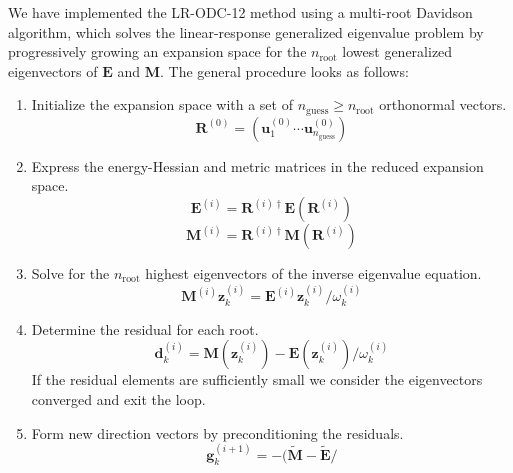     We have implemented the LR-ODC-12 method using a multi-root Davidson algorithm,
    which solves the linear-response generalized eigenvalue problem by progressively
    growing an expansion space for the \(n_\mathrm{root}\) lowest generalized
    eigenvectors of \(\mathbf{E}\) and \(\mathbf{M}\).
    The general procedure looks as follows:
    \begin{enumerate}
        \item
            \label{item:davidson-initialization}
            Initialize the expansion space with a set of \(n_\mathrm{guess}\geq
            n_\mathrm{root}\) orthonormal vectors.
            \[
                \mathbf{R}^{(0)}
                =
                (
                    \mathbf{u}_1^{(0)}
                    \cdots
                    \mathbf{u}_{n_\mathrm{guess}}^{(0)}
                )
            \]
        \item
            \label{item:davidson-step-one}
            Express the energy-Hessian and metric matrices in the reduced expansion
            space.
            \[
                \mathbf{E}^{(i)}
                =
                \mathbf{R}^{(i)\dagger}
                \mathbf{E}(\mathbf{R}^{(i)})
            \]
            \[
                \mathbf{M}^{(i)}
                =
                \mathbf{R}^{(i)\dagger}
                \mathbf{M}(\mathbf{R}^{(i)})
            \]
        \item
            Solve for the \(n_\mathrm{root}\) highest eigenvectors of the
            inverse eigenvalue equation.
            \[
                \mathbf{M}^{(i)}
                \mathbf{z}_k^{(i)}
                =
                \mathbf{E}^{(i)}
                \mathbf{z}_k^{(i)}/
                \omega_k^{(i)}
            \]
        \item
            Determine the residual for each root.
            \[
                \mathbf{d}_k^{(i)}
                =
                \mathbf{M}(\mathbf{z}_k^{(i)})
                -
                \mathbf{E}(\mathbf{z}_k^{(i)})/
                \omega_k^{(i)}
            \]
            If the residual elements are sufficiently small we consider the
            eigenvectors converged and exit the loop.
        \item
            \label{item:davidson-step-three}
            Form new direction vectors by preconditioning the residuals.
            \[
                \mathbf{g}_k^{(i+1)}
                =
                -
                (
                    \tilde{\mathbf{M}}
                    -
                    \tilde{\mathbf{E}}/
\]
\end{enumerate}
